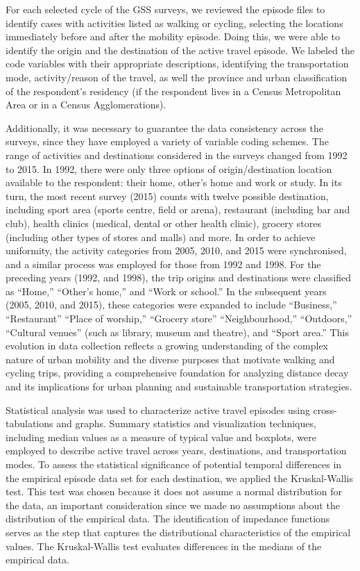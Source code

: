 \documentclass[preprint, 3p,
authoryear]{elsarticle} %
\begin{document}
For each selected cycle of the GSS surveys, we reviewed the episode
files to identify cases with activities listed as walking or cycling,
selecting the locations immediately before and after the mobility
episode. Doing this, we were able to identify the origin and the
destination of the active travel episode. We labeled the code variables
with their appropriate descriptions, identifying the transportation
mode, activity/reason of the travel, as well the province and urban
classification of the respondent's residency (if the respondent lives in
a Census Metropolitan Area or in a Census Agglomerations).

Additionally, it was necessary to guarantee the data consistency across
the surveys, since they have employed a variety of variable coding
schemes. The range of activities and destinations considered in the
surveys changed from 1992 to 2015. In 1992, there were only three
options of origin/destination location available to the respondent:
their home, other's home and work or study. In its turn, the most recent
survey (2015) counts with twelve possible destination, including sport
area (sports centre, field or arena), restaurant (including bar and
club), health clinics (medical, dental or other health clinic), grocery
stores (including other types of stores and malls) and more. In order to
achieve uniformity, the activity categories from 2005, 2010, and 2015
were synchronised, and a similar process was employed for those from
1992 and 1998. For the preceding years (1992, and 1998), the trip
origins and destinations were classified as ``Home,'' ``Other's home,''
and ``Work or school.'' In the subsequent years (2005, 2010, and 2015),
these categories were expanded to include ``Business,'' ``Restaurant''
``Place of worship,'' ``Grocery store'' ``Neighbourhood,'' ``Outdoors,''
``Cultural venues'' (such as library, museum and theatre), and ``Sport
area.'' This evolution in data collection reflects a growing
understanding of the complex nature of urban mobility and the diverse
purposes that motivate walking and cycling trips, providing a
comprehensive foundation for analyzing distance decay and its
implications for urban planning and sustainable transportation
strategies.

Statistical analysis was used to characterize active travel episodes
using cross-tabulations and graphs. Summary statistics and visualization
techniques, including median values as a measure of typical value and
boxplots, were employed to describe active travel across years,
destinations, and transportation modes. To assess the statistical
significance of potential temporal differences in the empirical episode
data set for each destination, we applied the Kruskal-Wallis test. This
test was chosen because it does not assume a normal distribution for the
data, an important consideration since we made no assumptions about the
distribution of the empirical data. The identification of impedance
functions serves as the step that captures the distributional
characteristics of the empirical values. The Kruskal-Wallis test
evaluates differences in the medians of the empirical data.
\end{document}
